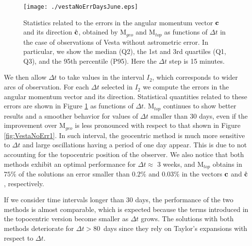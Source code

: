\documentclass[11pt]{article}
\begin{document}
\begin{figure}[ht!]
    \centering
    \texttt{[image: ./vestaNoErrDaysJune.eps]}
    \caption{Statistics related to the errors in the angular momentum vector ${\bf c}$ and its direction $\hat{\bf c}$, obtained by M$_{geo}$ and M$_{top}$ as functions of $\Delta t$ in the case of observations of Vesta without astrometric error. 
    In particular, we show the median (Q2), the 1st and 3rd quartiles (Q1, Q3), and the 95th percentile (P95). 
    Here the $\Delta t$ step is 15 minutes.}
    \label{fig:VestaNoErr2}
\end{figure}

We then allow $\Delta t$ to take values in the interval $I_2$, which corresponds to wider arcs of observation. 
For each $\Delta t$ selected in $I_2$ we compute the errors in the angular momentum vector and its direction. 
Statistical quantities related to these errors are shown in Figure \ref{fig:VestaNoErr2} as functions of $\Delta t$. 
M$_{top}$ continues to show better results and a smoother behavior for values of $\Delta t$ smaller than 30 days, even if the improvement over M$_{geo}$ is less pronounced with respect to that shown in Figure \ref{fig:VestaNoErr1}. 
In such interval, the geocentric method is much more sensitive to $\Delta t$ and large oscillations having a period of one day appear. 
This is due to not accounting for the topocentric position of the observer. 
We also notice that both methods exhibit an optimal performance for $\Delta t\approx$ 3 weeks, and M$_{top}$ obtains in $75\%$ of the solutions an error smaller than $0.2\%$ and $0.03\%$ in the vectors ${\bf c}$ and $\hat{{\bf c}}$, respectively.

If we consider time intervals longer than 30 days, the performance of the two methods is almost comparable, which is expected because the terms introduced in the topocentric version become smaller as $\Delta t$ grows. 
The solutions with both methods deteriorate for $\Delta t > 80$~days since they rely on Taylor's expansions with respect to $\Delta t$.
\end{document}
